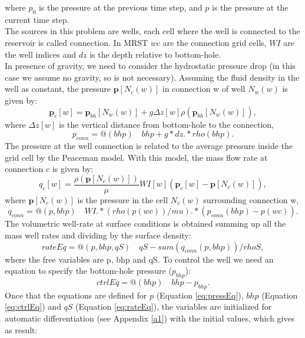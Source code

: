 \documentclass[12pt]{report}
\begin{document}
where $p_0$ is the pressure at the previous time step, and $p$ is the pressure at the current time step.\\ 
The sources in this problem are wells, each cell where the well is connected to the reservoir is called
connection. In MRST $wc$ are the connection grid cells, $WI$ are the well indices and $dz$ is the depth
relative to bottom-hole. \\
In presence of gravity, we need to consider the hydrostatic pressure drop (in this case we assume no gravity, so is not necessary).
Assuming the fluid density in the well as constant, the pressure $\mathbf{p}[N_c(w)]$ in connection w
of well $N_w(w)$ is given by:
$$\mathbf{p}_c[w]=\mathbf{p}_{bh}[N_w(w)]+g \Delta z[w]\rho(\mathbf{p}_{bh}[N_w(w)]),$$
where $\Delta z[w]$ is the vertical distance from bottom-hole to the connection, 
$$p_{conn}=@(bhp)\quad bhp+g*dz.*rho(bhp).$$
The pressure at the well connection is related to the average 
pressure inside the grid cell by the Peaceman model. With this model, the mass flow rate at connection c 
is given by:
$$q_c[w]=\frac{\rho(\mathbf{p}[N_c(w)])}{\mu}WI[w](\mathbf{p}_c[w]-\mathbf{p}[N_c(w)]),$$
where $\mathbf{p}[N_c(w)]$ is the pressure in the cell $N_c(w)$ surrounding connection w,
$$q_{conn}=@(p,bhp) \quad WI.*(rho(p(wc))/mu).*(p_{conn}(bhp)-p(wc)).$$
The volumetric well-rate at surface conditions is obtained summing up all the mass well rates and dividing by the 
surface density:
\begin{equation}\label{eq:rateEq}
 rateEq=@(p,bhp,qS) \quad qS-sum(q_{conn}(p,bhp))/rhoS,
\end{equation}
where the free variables are p, bhp and qS. To control the well we need an equation to specify 
the bottom-hole pressure ($p_{bhp}$):
\begin{equation}\label{eq:ctrlEq}
 ctrlEq=@(bhp)\quad bhp-p_{bhp}.
\end{equation}
Once that the equations are defined for $p$ (Equation \eqref{eq:pressEq}), $bhp$ (Equation \eqref{eq:ctrlEq})
and $qS$ (Equation \eqref{eq:rateEq}), the variables are initialized for automatic differentiation (see Appendix \ref{a1})
with the initial values, which gives as result:
\end{document}
